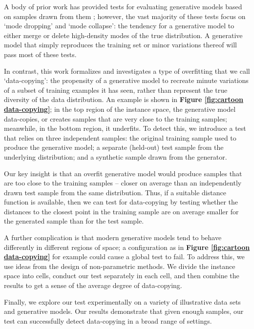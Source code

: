 A body of prior work has provided tests for evaluating generative models based on samples drawn from them \citep{salimans, mehdi,  Ruslan_et_al, heusel}; however, the vast majority of these tests  focus on `mode dropping' and `mode collapse': the tendency for a generative model to either merge or delete high-density modes of the true distribution. A generative model that simply reproduces the training set or minor variations thereof will pass most of these tests. 

In contrast, this work formalizes and investigates a type of overfitting that we call `data-copying': the propensity of a generative model to recreate minute variations of a subset of training examples it has seen, rather than represent the true diversity of the data distribution. An example is shown in \textbf{Figure \ref{fig:cartoon data-copying}}; in the top region of the instance space, the generative model data-copies, or creates samples that are very close to the training samples; meanwhile, in the bottom region, it underfits. To detect this, we introduce a test that relies on three independent samples: the original training sample used to produce the generative model; a separate (held-out) test sample from the underlying distribution; and a synthetic sample drawn from the generator. 

Our key insight is that an overfit generative model would produce samples that are too close to the training samples -- closer on average than an independently drawn test sample from the same distribution. Thus, if a suitable distance function is available, then we can test for data-copying by testing whether the distances to the closest point in the training sample are on average smaller for the generated sample than for the test sample.

A further complication is that modern generative models tend to behave differently in different regions of space; a configuration as in \textbf{Figure \ref{fig:cartoon data-copying}} for example could cause a global test to fail. To address this, we use ideas from the design of non-parametric methods. We divide the instance space into cells, conduct our test separately in each cell, and then combine the results to get a sense of the average degree of data-copying.
 
Finally, we explore our test experimentally on a variety of illustrative data sets and generative models. Our results demonstrate that given enough samples, our test can successfully detect data-copying in a broad range of settings. 
 
